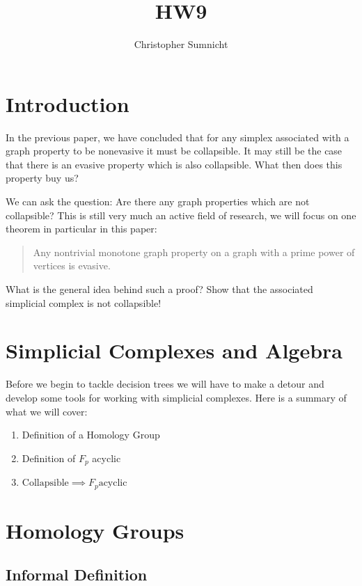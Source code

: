 \documentclass[letterpaper,12pt]{article}
\begin{document}
\title{HW9}
\author{Christopher Sumnicht}
\maketitle

\section{Introduction}

In the previous paper, we have concluded that for any simplex associated with a graph property to be nonevasive it must be collapsible. It may still be the case that there is an evasive property which is also collapsible. What then does this property buy us?

We can ask the question: Are there any graph properties which are not collapsible? This is still very much an active field of research, we will focus on one theorem in particular in this paper:

\begin{quote}
    Any nontrivial monotone graph property on a graph with a prime power of vertices is evasive.
\end{quote}

What is the general idea behind such a proof? Show that the associated simplicial complex is not collapsible!

\section{Simplicial Complexes and Algebra}

Before we begin to tackle decision trees we will have to make a detour and develop some tools for working with simplicial complexes. Here is a summary of what we will cover:

\begin{enumerate}
    \item{
            Definition of a Homology Group
        }
    \item{
            Definition of $F_p$ acyclic
        }
    \item{
            $\text{Collapsible} \implies F_p  \text{acyclic}$
        }
\end{enumerate}

\section{Homology Groups}

\subsection{Informal Definition}
\end{document}
